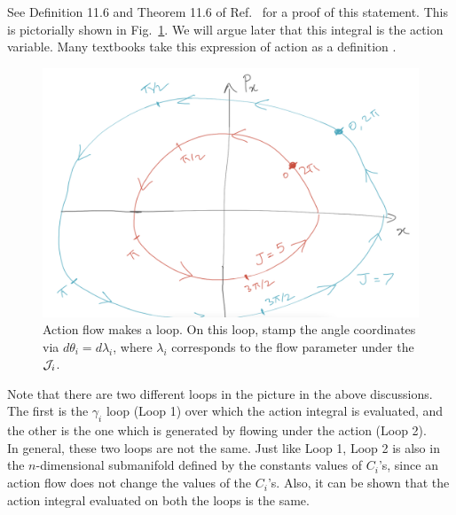 See Definition 11.6 and Theorem 11.6 of
Ref.~\cite{fasano} for a proof of this statement.
This is pictorially shown in
Fig.~\ref{action_loop}. 
We will argue later that this integral
is the action variable.
Many textbooks take this expression of action as a definition \cite{goldstein2013classical}. \\






\begin{figure}
  \centering
  \includegraphics[width=0.7\linewidth]{action_loop}
  \caption{ Action flow makes a loop. On this loop,
  stamp the angle coordinates via $d \theta_i = d \lambda_i$,
  where $\lambda_i$ corresponds to the flow parameter under the 
  $\mathcal{J}_i$.
    \vspace{-1.em}
  }
  \label{action_loop}
\end{figure}





\hfill \break


\begin{definition}[label=def:C2]


Note that there are two different loops in the picture in the  
above discussions. The first is the $\gamma_i$ loop (Loop 1) over which
the action integral is evaluated, and the other is the one which is generated
by flowing under the action (Loop 2).\\


In general, these two loops are not the same.
Just like Loop 1,
Loop 2 is also in the $n$-dimensional submanifold
defined by the constants values of $C_i$'s, since
an action flow does not change the values of the $C_i$'s.
 Also, it can be shown that the action
integral evaluated on both the loops is the same.
 



\end{definition}

